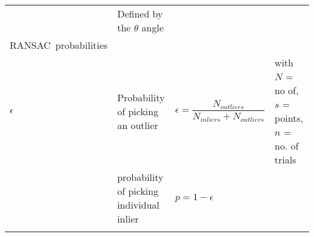 \documentclass[
]{article}
\newcommand{\columnA}{0.06}
\newcommand{\columnB}{0.18}
\newcommand{\columnC}{0.33}
\newcommand{\columnD}{0.33}
\begin{document}
\begin{longtable}[]{@{}llll@{}}
\begin{minipage}[t]{\columnC\columnwidth}
\end{minipage} & \begin{minipage}[t]{\columnD\columnwidth}\raggedright
Defined by the \(\theta\) angle\strut
\end{minipage}\hline\tabularnewline
\begin{minipage}[t]{\columnA\columnwidth}\raggedright
RANSAC~probabilities\strut
\end{minipage} & \begin{minipage}[t]{\columnB\columnwidth}\raggedright
\strut
\end{minipage} & \begin{minipage}[t]{\columnC\columnwidth}\raggedright
\strut
\end{minipage} & \begin{minipage}[t]{\columnD\columnwidth}\raggedright
\strut
\end{minipage}\hline\tabularnewline
\begin{minipage}[t]{\columnA\columnwidth}\raggedright
\(\epsilon\)\strut
\end{minipage} & \begin{minipage}[t]{\columnB\columnwidth}\raggedright
Probability of picking an outlier\strut
\end{minipage} & \begin{minipage}[t]{\columnC\columnwidth}\raggedright
\(\epsilon = \dfrac{N_{outliers}}{N_{inliers} + N_{outliers}}\)\strut
\end{minipage} & \begin{minipage}[t]{\columnD\columnwidth}\raggedright
with \(N\) = no of, \(s\) = points, \(n\) = no. of trials\strut
\end{minipage}\hline\tabularnewline
\begin{minipage}[t]{\columnA\columnwidth}\raggedright
\strut
\end{minipage} & \begin{minipage}[t]{\columnB\columnwidth}\raggedright
probability of picking individual inlier\strut
\end{minipage} & \begin{minipage}[t]{\columnC\columnwidth}\raggedright
\(p=1-\epsilon\)\strut
\end{minipage} & \begin{minipage}[t]{\columnD\columnwidth}\raggedright
\strut
\end{minipage}\hline\tabularnewline
\begin{minipage}[t]{\columnA\columnwidth}\raggedright
\strut
\end{minipage} & \begin{minipage}[t]{\columnB\columnwidth}\raggedright

\end{minipage}
\end{longtable}
\end{document}

